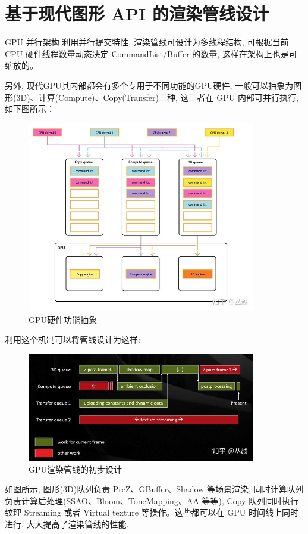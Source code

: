 \documentclass[UTF8]{ctexart}
\begin{document}
\section{基于现代图形 API 的渲染管线设计\cite{modernGraphicsAPI}}
GPU 并行架构
利用并行提交特性, 渲染管线可设计为多线程结构, 可根据当前 CPU 硬件线程数量动态决定 CommandList/Buffer 的数量, 这样在架构上也是可缩放的。

另外, 现代GPU其内部都会有多个专用于不同功能的GPU硬件, 一般可以抽象为图形(3D)、计算(Compute)、Copy(Transfer)三种, 这三者在 GPU 内部可并行执行, 如下图所示：

\begin{figure}[H]
  \includegraphics[width=10cm]{rendering_framework.jpg}
  \centering
  \caption{GPU硬件功能抽象}
  \label{fig:gpu_hardware_abstraction}
\end{figure}

利用这个机制可以将管线设计为这样:
\begin{figure}[H]
  \includegraphics[width=10cm]{rendering_pipeline_design.jpg}
  \centering
  \caption{GPU渲染管线的初步设计}
  \label{fig:gpu_rendering_pipeline_design_0}
\end{figure}

如图所示, 图形(3D)队列负责 PreZ、GBuffer、Shadow 等场景渲染, 同时计算队列负责计算后处理(SSAO、Bloom、ToneMapping、AA 等等), Copy 队列同时执行纹理 Streaming 或者 Virtual texture 等操作。这些都可以在 GPU 时间线上同时进行, 大大提高了渲染管线的性能.
\end{document}
